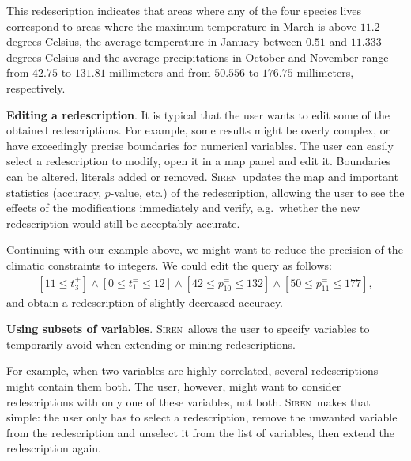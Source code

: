 \documentclass{llncs}
\newcommand{\prg}[1]{\textbf{#1}.}
\newcommand{\Siren}{\textsc{Siren}}
\begin{document}
This redescription indicates that areas where any of the four species
lives correspond to areas where the maximum temperature in March is
above $11.2$ degrees Celsius, the average temperature in January
between $0.51$ and $11.333$ degrees Celsius and the average
precipitations in October and November range from $42.75$ to $131.81$
millimeters and from $50.556$ to $176.75$ millimeters, respectively.

\prg{Editing a redescription} It is typical that the user wants to
edit some of the obtained redescriptions. For example, some results
might be overly complex, or have exceedingly precise boundaries for
numerical variables. The user can easily select a redescription to
modify, open it in a map panel and edit it. Boundaries can be altered,
literals added or removed. \Siren\ updates the map and important
statistics (accuracy, $p$-value, etc.) of the redescription, allowing
the user to see the effects of the modifications immediately and
verify, e.g.\ whether the new redescription would still be acceptably
accurate.

Continuing with our example above, we might want to reduce the
precision of the climatic constraints to integers. We could edit the
query as follows:
\begin{equation*}
\begin{array}{l}
[11 \leq t_{3}^{+}] \land  [0 \leq t_{1}^{=} \leq 12]%
\land  [42 \leq p_{10}^{=} \leq 132] \land [50 \leq p_{11}^{=} \leq 177],
\end{array}
\end{equation*}
and obtain a redescription of slightly decreased accuracy. %

\prg{Using subsets of variables} 
\Siren\ allows the user to specify variables to temporarily 
avoid when extending or mining redescriptions.

For example, when two variables are highly
correlated, several redescriptions might contain them
both. The user, however, might want to consider
redescriptions with only one of these variables, not
both. \Siren\ makes that simple: the user only has to select a
redescription, remove the unwanted variable from the
redescription and unselect it from the list of variables, then extend the
redescription again. 
\end{document}
